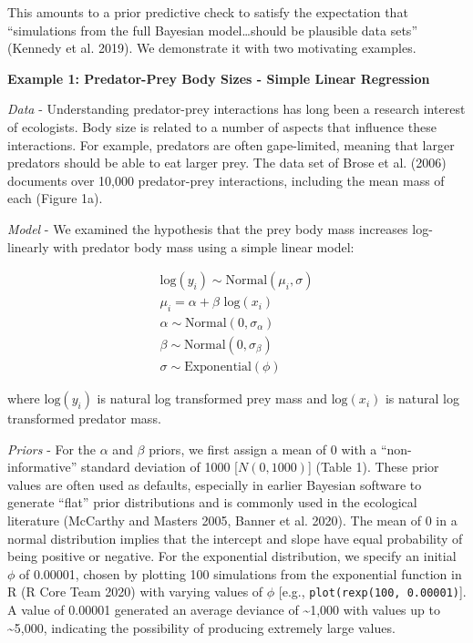 \documentclass[
  12pt,
]{article}
\begin{document}
This amounts to a prior predictive check to satisfy the expectation that
``simulations from the full Bayesian model\ldots should be plausible
data sets'' (Kennedy et al. 2019). We demonstrate it with two motivating
examples.

\textbf{Example 1: Predator-Prey Body Sizes - Simple Linear Regression}

\emph{Data} - Understanding predator-prey interactions has long been a
research interest of ecologists. Body size is related to a number of
aspects that influence these interactions. For example, predators are
often gape-limited, meaning that larger predators should be able to eat
larger prey. The data set of Brose et al. (2006) documents over 10,000
predator-prey interactions, including the mean mass of each (Figure 1a).

\emph{Model} - We examined the hypothesis that the prey body mass
increases log-linearly with predator body mass using a simple linear
model:

\begin{align}
\text{log} (y_i) \sim \text{Normal}(\mu_i, \sigma)\\
\mu_i = \alpha + \beta \text{ log}(x_i)\\
\alpha \sim \text{Normal}(0, \sigma_{\alpha})\\
\beta \sim \text{Normal}(0, \sigma_{\beta})\\
\sigma \sim \text{Exponential}(\phi)
\end{align}

where \(\text{log}(y_i)\) is natural log transformed prey mass and
\(\text{log}(x_i)\) is natural log transformed predator mass.

\emph{Priors} - For the \(\alpha\) and \(\beta\) priors, we first assign
a mean of 0 with a ``non-informative'' standard deviation of 1000
{[}\(N(0, 1000)\){]} (Table 1). These prior values are often used as
defaults, especially in earlier Bayesian software to generate ``flat''
prior distributions and is commonly used in the ecological literature
(McCarthy and Masters 2005, Banner et al. 2020). The mean of 0 in a
normal distribution implies that the intercept and slope have equal
probability of being positive or negative. For the exponential
distribution, we specify an initial \(\phi\) of 0.00001, chosen by
plotting 100 simulations from the exponential function in R (R Core Team
2020) with varying values of \(\phi\) {[}e.g.,
\texttt{plot(rexp(100,\ 0.00001)}{]}. A value of 0.00001 generated an
average deviance of \textasciitilde1,000 with values up to
\textasciitilde5,000, indicating the possibility of producing extremely
large values.
\end{document}

